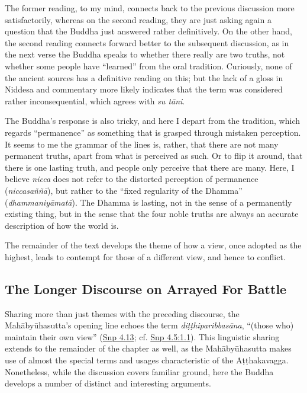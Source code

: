 \documentclass[12pt,openany]{book}%
\begin{document}
The former reading, to my mind, connects back to the previous discussion more satisfactorily, whereas on the second reading, they are just asking again a question that the Buddha just answered rather definitively. On the other hand, the second reading connects forward better to the subsequent discussion, as in the next verse the Buddha speaks to whether there really are two truths, not whether some people have “learned” from the oral tradition. Curiously, none of the ancient sources has a definitive reading on this; but the lack of a gloss in Niddesa and commentary more likely indicates that the term was considered rather inconsequential, which agrees with \textit{su \textsanskrit{tāni}}.

The Buddha’s response is also tricky, and here I depart from the tradition, which regards “permanence” as something that is grasped through mistaken perception. It seems to me the grammar of the lines is, rather, that there are not many permanent truths, apart from what is perceived as such. Or to flip it around, that there is one lasting truth, and people only perceive that there are many. Here, I believe \textit{nicca} does not refer to the distorted perception of permanence (\textit{\textsanskrit{niccasaññā}}), but rather to the “fixed regularity of the Dhamma” (\textit{\textsanskrit{dhammaniyāmatā}}). The Dhamma is lasting, not in the sense of a permanently existing thing, but in the sense that the four noble truths are always an accurate description of how the world is.

The remainder of the text develops the theme of how a view, once adopted as the highest, leads to contempt for those of a different view, and hence to conflict.

\subsection*{The Longer Discourse on Arrayed For Battle}

Sharing more than just themes with the preceding discourse, the \textsanskrit{Mahābyūhasutta}’s opening line echoes the term \textit{\textsanskrit{diṭṭhiparibbasāna}}, “(those who) maintain their own view” (\href{https://suttacentral.net/snp4.13/en/sujato}{Snp 4.13}; cf. \href{https://suttacentral.net/snp4.5/en/sujato\#1.1}{Snp 4.5:1.1}). This linguistic sharing extends to the remainder of the chapter as well, as the \textsanskrit{Mahābyūhasutta} makes use of almost the special terms and usages characteristic of the \textsanskrit{Aṭṭhakavagga}. Nonetheless, while the discussion covers familiar ground, here the Buddha develops a number of distinct and interesting arguments.
\end{document}
